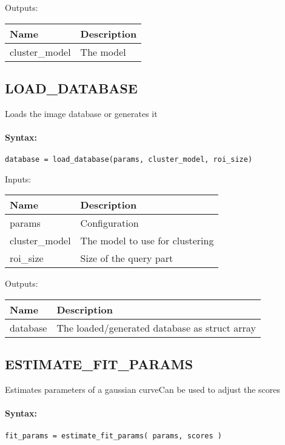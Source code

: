 \bigskip
Outputs:

\begin{tabular}{|p{}|p{}|}
\hline
\textbf{Name} & \textbf{Description} \\
\hline \hline
cluster\_model & The model  \\ \hline
\end{tabular}

\subsection{LOAD\_DATABASE}

Loads the image database or generates it

\paragraph{Syntax:} \verb|database = load_database(params, cluster_model, roi_size)|

\bigskip
Inputs:

\begin{tabular}{|p{}|p{}|}
\hline
\textbf{Name} & \textbf{Description} \\
\hline \hline
params & Configuration  \\ \hline
cluster\_model & The model to use for clustering  \\ \hline
roi\_size & Size of the query part  \\ \hline
\end{tabular}

\bigskip
Outputs:

\begin{tabular}{|p{}|p{}|}
\hline
\textbf{Name} & \textbf{Description} \\
\hline \hline
database & The loaded/generated database as struct array  \\ \hline
\end{tabular}

\subsection{ESTIMATE\_FIT\_PARAMS}

Estimates parameters of a gaussian curveCan be used to adjust the scores

\paragraph{Syntax:} \verb|fit_params = estimate_fit_params( params, scores )|

